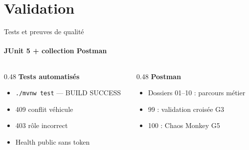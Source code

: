\documentclass[aspectratio=169, t]{beamer}
\begin{document}
\section{Validation}

\begin{frame}{Tests et preuves de qualité}
\framesubtitle{JUnit 5 + collection Postman}

\begin{columns}[T,onlytextwidth]
\begin{column}{0.48\textwidth}
  \textbf{Tests automatisés}
  \small
  \begin{itemize}
    \item \texttt{./mvnw test} — BUILD SUCCESS
    \item 409 conflit véhicule
    \item 403 rôle incorrect
    \item Health public sans token
  \end{itemize}
\end{column}
\begin{column}{0.48\textwidth}
  \textbf{Postman}
  \small
  \begin{itemize}
    \item Dossiers 01--10 : parcours métier
    \item 99 : validation croisée G3
    \item 100 : Chaos Monkey G5
  \end{itemize}

\end{column}
\end{columns}
\end{frame}
\end{document}

